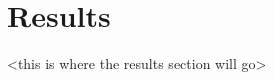 \documentclass{article}
\begin{document}









\section{Results}

<this is where the results section will go>
\end{document}
